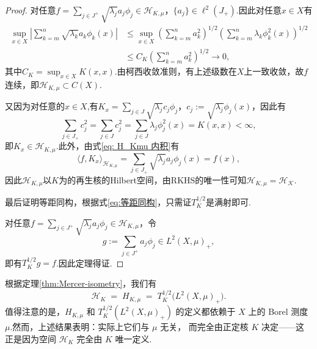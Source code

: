 \documentclass[12pt, a4paper, oneside]{ctexbook}
\begin{document}
\begin{proof}
    对任意$f = \sum_{j\in J^+}\sqrt{\lambda_j}a_j\phi_j\in \mathcal{H}_{K,\mu}$，$\{a_j\}\in \ell^2(J_+)$.因此对任意$x\in X$有
    \begin{align*}
        \sup_{x\in X} \left|\sum_{k=m}^n \sqrt{\lambda_k}a_k\phi_k(x)\right|&\leq \sup_{x\in X}\left(\sum_{k=m}^na_k^2\right)^{1/2}\left(\sum_{k=m}^n\lambda_k\phi^2_k(x)\right)^{1/2}\\
        &\leq C_K\left(\sum_{k=m}^na_k^2\right)^{1/2}\to 0,
    \end{align*}
其中$C_K = \sup_{x\in X}K(x,x)$.由柯西收敛准则，有上述级数在$X$上一致收敛，故$f$连续，即$\mathcal{H}_{K,\mu}\subset C(X).$

又因为对任意的$x\in X$,有$K_x = \sum_{j\in J}\sqrt{\lambda_j}c_j\phi_j$，$c_j:=\sqrt{\lambda_j}\phi_j(x)$，因此有
\begin{equation*}
    \sum_{j\in J_+}c_j^2 = \sum_{j\in J}c_j^2 = \sum_{j\in J}\lambda_j\phi_j^2(x) = K(x,x)<\infty,
\end{equation*}
即$K_x\in \mathcal{H}_{K,\mu}.$此外，由式\eqref{eq: H_Kmu 内积}有
\begin{equation*}
    \langle f,K_x\rangle_{\mathcal{H}_{K,\mu}}=\sum_{j\in J_+}\sqrt{\lambda_j}a_j\phi_j(x) = f(x),
\end{equation*}
因此$\mathcal{H}_{K,\mu}$以$K$为的再生核的Hilbert空间，由RKHS的唯一性可知$\mathcal{H}_{K,\mu}=\mathcal{H_K}.$

最后证明等距同构，根据式\eqref{eq:等距同构}，只需证$T_K^{1/2}$是满射即可.

对任意$f = \sum_{j\in J^+}\sqrt{\lambda_j}a_j\phi_j\in \mathcal{H}_{K,\mu}$，令$$g:=\sum_{j\in J^+}a_j\phi_j\in L^2(X,\mu)_+,$$即有$T_K^{1/2}g = f$.因此定理得证.
\end{proof}
根据定理\ref{thm:Mercer-isometry}，我们有
\[
\mathcal{H}_K \;=\; H_{K,\mu} \;=\; T_K^{1/2}\big(L^{2}(X,\mu)_{+}\big).
\]
值得注意的是，$H_{K,\mu}$ 和 $T_K^{1/2}\!\left(L^{2}(X,\mu)_{+}\right)$ 的定义都依赖于
$X$ 上的 Borel 测度 $\mu$.然而，上述结果表明：实际上它们与 $\mu$ 无关，
而完全由正定核 $K$ 决定——这正是因为空间 $\mathcal{H}_K$ 完全由 $K$ 唯一定义.
\end{document}
